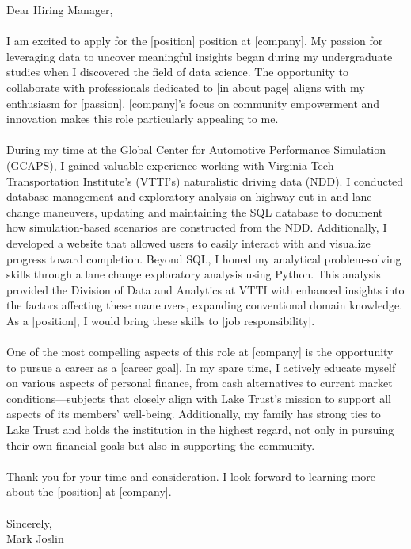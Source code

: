 \documentclass[10pt]{../cv} %
\begin{document}

\cvHeader{\name}{\designation}{\phone}{\location}{\email}{\github}{\linkedin}
\vspace{\baselineskip}


Dear Hiring Manager,
\\
\\
I am excited to apply for the [position] position at [company]. My passion for leveraging data to uncover meaningful insights began during my undergraduate studies when I discovered the field of data science. The opportunity to collaborate with professionals dedicated to [in about page] aligns with my enthusiasm for [passion]. [company]’s focus on community empowerment and innovation makes this role particularly appealing to me.
\\
\\
During my time at the Global Center for Automotive Performance Simulation (GCAPS), I gained valuable experience working with Virginia Tech Transportation Institute’s (VTTI’s) naturalistic driving data (NDD). I conducted database management and exploratory analysis on highway cut-in and lane change maneuvers, updating and maintaining the SQL database to document how simulation-based scenarios are constructed from the NDD. Additionally, I developed a website that allowed users to easily interact with and visualize progress toward completion. Beyond SQL, I honed my analytical problem-solving skills through a lane change exploratory analysis using Python. This analysis provided the Division of Data and Analytics at VTTI with enhanced insights into the factors affecting these maneuvers, expanding conventional domain knowledge. As a [position], I would bring these skills to [job responsibility].
\\
\\
One of the most compelling aspects of this role at [company] is the opportunity to pursue a career as a [career goal]. In my spare time, I actively educate myself on various aspects of personal finance, from cash alternatives to current market conditions—subjects that closely align with Lake Trust’s mission to support all aspects of its members’ well-being. Additionally, my family has strong ties to Lake Trust and holds the institution in the highest regard, not only in pursuing their own financial goals but also in supporting the community.
\\
\\
Thank you for your time and consideration. I look forward to learning more about the [position] at [company].
\\
\\
Sincerely,
\\
Mark Joslin
\end{document}
